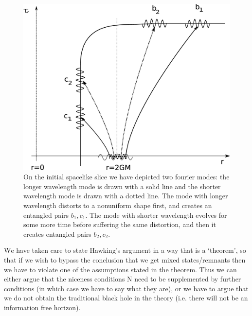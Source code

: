 \documentclass[12pt]{article}
\begin{document}
\begin{figure}[ht]
\includegraphics[scale=.20]{matftthree.eps}
%
%
\caption{On the initial spacelike slice we have depicted two fourier modes: the longer wavelength mode is drawn with a solid line and the shorter wavelength mode is drawn with a dotted line. The mode with longer wavelength distorts to a nonuniform shape first, and creates an entangled pairs $b_1, c_1$. The mode with shorter wavelength evolves for some more time before suffering the same distortion, and then it creates  entangled pairs $b_2, c_2$.}
\label{matftthree}       %
\end{figure}




\b

We have taken care to state Hawking's argument in a way that is a `theorem', so that if we wish to bypass the conclusion that we get mixed states/remnants then we have to violate one of the assumptions stated in the theorem. Thus we can either argue that the niceness conditions N need to be supplemented by further conditions (in which case we have to say what they are), or we have to argue that we do not obtain the traditional black hole in the theory (i.e. there will not be an information free horizon). 
\end{document}
